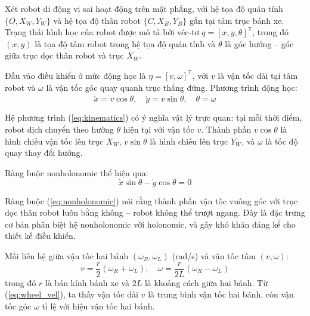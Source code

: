 \documentclass[12pt,a4paper]{article}
\newcommand{\T}{\mathsf{T}}
\begin{document}
Xét robot di động vi sai hoạt động trên mặt phẳng, với hệ tọa độ quán tính $\{O, X_W, Y_W\}$ và hệ tọa độ thân robot $\{C, X_B, Y_B\}$ gắn tại tâm trục bánh xe. Trạng thái hình học của robot được mô tả bởi véc-tơ $q = [x, y, \theta]^\T$, trong đó $(x, y)$ là tọa độ tâm robot trong hệ tọa độ quán tính và $\theta$ là góc hướng -- góc giữa trục dọc thân robot và trục $X_W$.

Đầu vào điều khiển ở mức động học là $\eta = [v, \omega]^\T$, với $v$ là vận tốc dài tại tâm robot và $\omega$ là vận tốc góc quay quanh trục thẳng đứng. Phương trình động học:
\begin{equation}\label{eq:kinematics}
    \dot{x} = v\cos\theta, \quad \dot{y} = v\sin\theta, \quad \dot{\theta} = \omega
\end{equation}

Hệ phương trình (\ref{eq:kinematics}) có ý nghĩa vật lý trực quan: tại mỗi thời điểm, robot dịch chuyển theo hướng $\theta$ hiện tại với vận tốc $v$. Thành phần $v\cos\theta$ là hình chiếu vận tốc lên trục $X_W$, $v\sin\theta$ là hình chiếu lên trục $Y_W$, và $\omega$ là tốc độ quay thay đổi hướng.

Ràng buộc nonholonomic thể hiện qua:
\begin{equation}\label{eq:nonholonomic}
    \dot{x}\sin\theta - \dot{y}\cos\theta = 0
\end{equation}

Ràng buộc (\ref{eq:nonholonomic}) nói rằng thành phần vận tốc vuông góc với trục dọc thân robot luôn bằng không -- robot không thể trượt ngang. Đây là đặc trưng cơ bản phân biệt hệ nonholonomic với holonomic, và gây khó khăn đáng kể cho thiết kế điều khiển.

Mối liên hệ giữa vận tốc hai bánh $(\omega_R, \omega_L)$ (rad/s) và vận tốc tâm $(v, \omega)$:
\begin{equation}\label{eq:wheel_vel}
    v = \frac{r}{2}(\omega_R + \omega_L), \quad \omega = \frac{r}{2L}(\omega_R - \omega_L)
\end{equation}
trong đó $r$ là bán kính bánh xe và $2L$ là khoảng cách giữa hai bánh. Từ (\ref{eq:wheel_vel}), ta thấy vận tốc dài $v$ là trung bình vận tốc hai bánh, còn vận tốc góc $\omega$ tỉ lệ với hiệu vận tốc hai bánh.
\end{document}

